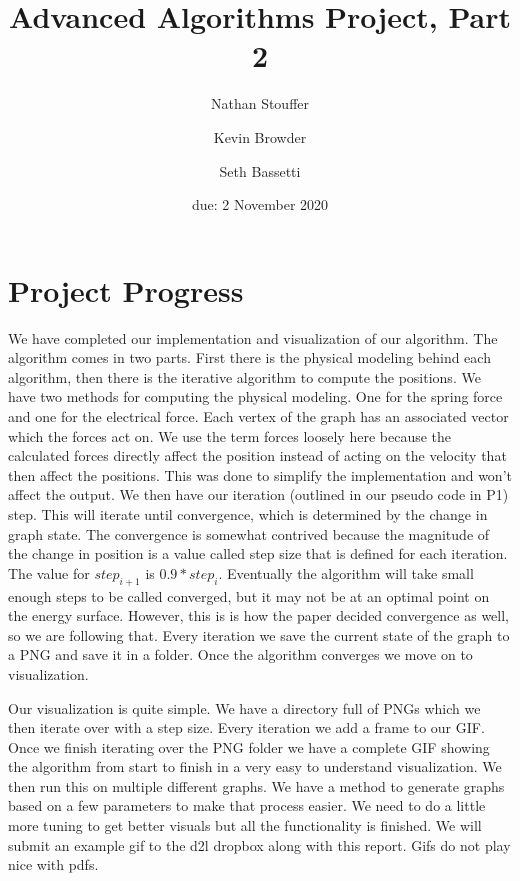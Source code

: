 \documentclass{article}
\title{Advanced Algorithms Project, Part 2}
\author{Nathan Stouffer \and Kevin Browder \and Seth Bassetti}
\date{due: 2 November 2020}
\begin{document}
\maketitle

\section{Project Progress}
We have completed our implementation and visualization of our algorithm. The algorithm comes in two parts. First there is the physical modeling behind each algorithm, then there is the iterative algorithm to compute the positions. We have two methods for computing the physical modeling. One for the spring force and one for the electrical force. Each vertex of the graph has an associated vector which the forces act on. We use the term forces loosely here because the calculated forces directly affect the position instead of acting on the velocity that then affect the positions. This was done to simplify the implementation and won't affect the output. We then have our iteration (outlined in our pseudo code in P1) step. This will iterate until convergence, which is determined by the change in graph state. The convergence is somewhat contrived because the magnitude of the change in position is a value called step size that is defined for each iteration. The value for $step_{i+1}$ is $0.9 * step_i$. Eventually the algorithm will take small enough steps to be called converged, but it may not be at an optimal point on the energy surface. However, this is is how the paper decided convergence as well, so we are following that. Every iteration we save the current state of the graph to a PNG and save it in a folder. Once the algorithm converges we move on to visualization.

Our visualization is quite simple. We have a directory full of PNGs which we then iterate over with a step size. Every iteration we add a frame to our GIF. Once we finish iterating over the PNG folder we have a complete GIF showing the algorithm from start to finish in a very easy to understand visualization. We then run this on multiple different graphs. We have a method to generate graphs based on a few parameters to make that process easier. We need to do a little more tuning to get better visuals but all the functionality is finished. We will submit an example gif to the d2l dropbox along with this report. Gifs do not play nice with pdfs.
\end{document}

